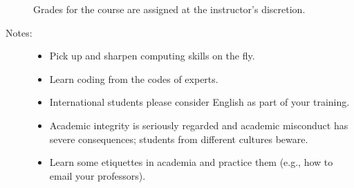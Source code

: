 \documentclass[11pt, twocolumn]{article}
\begin{document}
\begin{description}
\begin{description}

\end{description}


Grades for the course are assigned at the instructor's discretion.

\item[Notes:]\hspace{0pt}
  \begin{itemize}
  \item Pick up and sharpen computing skills on the fly. %
  \item Learn coding from the codes of experts. %
  \item International students please consider English as part of your training.
  \item Academic integrity is seriously regarded and academic misconduct
    has severe consequences; students from different cultures beware.
  \item Learn some etiquettes in academia and practice them (e.g., how
    to email your professors).
  \end{itemize}

\end{description}
\end{document}
